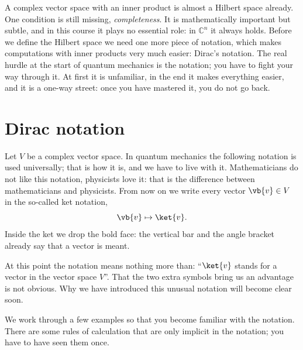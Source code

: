 A complex vector space with an inner product is almost a Hilbert space already. One condition
is still missing, \emph{completeness}. It is mathematically important but subtle, and in this
course it plays no essential role: in $\mathbb{C}^n$ it always holds. Before we
define the Hilbert space we need one more piece of notation, which makes computations with
inner products very much easier: Dirac's notation. The real hurdle at the start of quantum
mechanics is the notation; you have to fight your way through it. At first it is unfamiliar,
in the end it makes everything easier, and it is a one-way street: once you have mastered it,
you do not go back.

\section{Dirac notation}\label{c03.s4}

Let $V$ be a complex vector space. In quantum mechanics the following notation is used
universally; that is how it is, and we have to live with it. Mathematicians do not like this
notation, physicists love it: that is the difference between mathematicians and physicists.
From now on we write every vector $\vb{v} \in V$ in the so-called ket notation,
\begin{equation*}
  \vb{v} \mapsto \ket{v} .
\end{equation*}
Inside the ket we drop the bold face: the vertical bar and the angle bracket already say that a
vector is meant.

At this point the notation means nothing more than: ``$\ket{v}$ stands for a vector in the
vector space $V$''. That the two extra symbols bring us an advantage is not obvious. Why we have
introduced this unusual notation will become clear soon.

We work through a few examples so that you become familiar with the notation. There are some
rules of calculation that are only implicit in the notation; you have to have seen them once.

